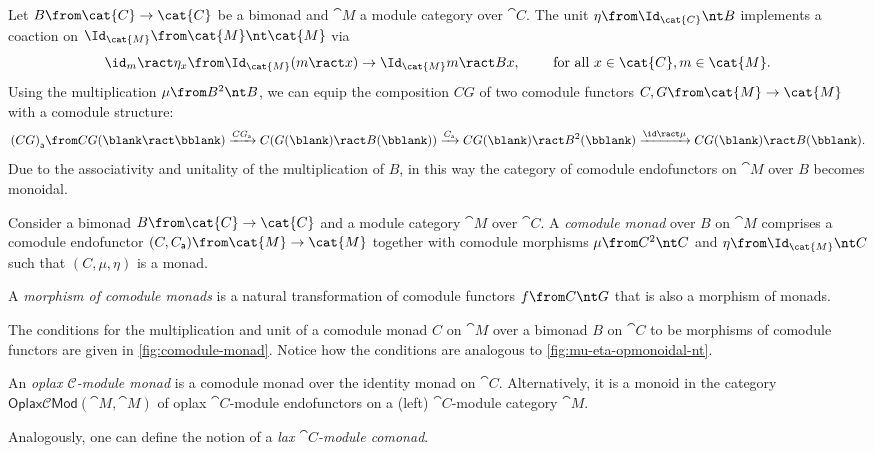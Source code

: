 Let \(B\from \cat{C} \to \cat{C}\) be a bimonad and \(\cat{M}\) a module category over \(\cat{C}\).
The unit \(\eta \from \Id_{\cat{C}} \nt B\) implements a coaction on \(\Id_{\cat{M}} \from \cat{M} \nt \cat{M}\) via
\[
  \id_m \ract \eta_x \from \Id_{\cat{M}}(m \ract x) \to \Id_{\cat{M}}m \ract Bx, \qquad \text{ for all } x \in \cat{C}, m \in \cat{M}.
  \]
Using the multiplication \(\mu \from B^2 \nt B\), we can equip the composition \(CG\) of two comodule functors \(C, G \from \cat{M} \to \cat{M}\) with a comodule structure:
\[
  {(CG)}_{\mathsf{a}}
  \from CG(\blank \ract \bblank)
  \xrightarrow{CG_{\mathsf{a}}} C(G(\blank) \ract B(\bblank))
  \xrightarrow{C_{\mathsf{a}}} CG(\blank) \ract B^2(\bblank)
  \xrightarrow{\id \ract \mu}
  CG(\blank) \ract B(\bblank).
\]
Due to the associativity and unitality of the multiplication of \(B\),
in this way the category of comodule endofunctors on \(\cat{M}\) over \(B\) becomes monoidal.

\begin{definition}\label{def: comodule_monad}
  Consider a bimonad \(B \from \cat{C} \to \cat{C}\)
  and a module category \(\cat{M}\) over \(\cat{C}\).
  A \emph{comodule monad} over \(B\) on \(\cat{M}\) comprises
  a comodule endofunctor \((C,C_{\mathsf{a}}) \from \cat{M} \to \cat{M}\) together with
  comodule morphisms \(\mu \from C^2 \nt C\)  and \(\eta \from \Id_{\cat{M}} \nt C\)
  such that \((C,\mu,\eta)\) is a monad.

  A \emph{morphism of comodule monads} is
  a natural transformation of comodule functors \(f \from C \nt G\)
  that is also a morphism of monads.
\end{definition}

The conditions for the multiplication and unit of
a comodule monad \(C\) on \(\cat{M}\)
over a bimonad \(B\) on \(\cat{C}\)
to be morphisms of comodule functors are given in \cref{fig:comodule-monad}.
Notice how the conditions are analogous to \cref{fig:mu-eta-opmonoidal-nt}.
\begin{figure}[htbp]
  \centering
  \vspace{-0.3cm}%
\end{figure}

\begin{example}\label{ex:oplax-module-monad}
  An \emph{oplax \(\mathcal{C}\)\hyp{}module monad} is a comodule monad over the identity monad on \(\cat{C}\).
  Alternatively, it is a monoid in the category
  \(\mathsf{Oplax}\mathcal{C}\mathsf{Mod}(\cat{M},\cat{M})\)
  of oplax \(\cat{C}\)\hyp{}module endofunctors on a (left) \(\cat{C}\)\hyp{}module category \(\cat{M}\).

  Analogously, one can define the notion of a \emph{lax \(\cat{C}\)\hyp{}module comonad}.
\end{example}

